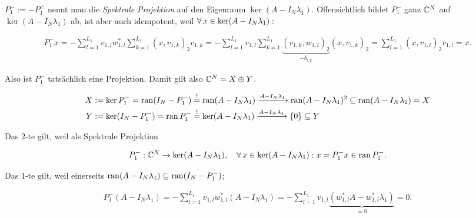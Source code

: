 \begin{remark} \label{spektrale_projektion}

    $P_1^- := -P_1^+$ nennt man die \textit{Spektrale Projektion} auf den Eigenraum $\ker (A - I_N \lambda_1)$.
    Offensichtlich bildet $P_1^-$ ganz $\mathbb{C}^N$ auf $\ker (A - I_N \lambda_1)$ ab, ist aber auch idempotent, weil $\forall \, x \in \ker (A - I_N \lambda_1):$

    \begin{align*}
        P_1^- x
        =
        -\sum_{l=1}^{L_1}
            v_{1, l}
            w_{1, l}^\ast
            \sum_{k=1}^{L_1}
                (x, v_{1, k})_2
                v_{1, k}
        =
        -\sum_{l=1}^{L_1}
            v_{1, l}
            \sum_{k=1}^{L_1}
                \underbrace{(v_{1, k}, w_{1, l})_2}_{-\delta_{l, k}}
                (x, v_{1, k})_2
        =
        \sum_{l=1}^{L_1}
            (x, v_{1, l})_2
            v_{1, l}
        =
        x.
    \end{align*}

    Also ist $P_1^-$ tatsächlich eine Projektion.
    Damit gilt also $ \mathbb{C}^N = X \oplus Y$.

    \begin{align*}
        X & := \ker P_1^- = \operatorname{ran} (I_N - P_1^-) \stackrel{!}{=} \operatorname{ran} (A - I_N \lambda_1) \xrightarrow{A - I_N \lambda_1} \operatorname{ran} (A - I_N \lambda_1)^2 \subseteq \operatorname{ran} (A - I_N \lambda_1) = X \\
        Y & := \ker (I_N - P_1^-) = \operatorname{ran} P_1^- \stackrel{!}{=} \ker (A - I_N \lambda_1) \xrightarrow{A - I_N \lambda_1} {\left \{ 0 \right \}} \subseteq Y
    \end{align*}

    Das $2$-te \Quote{!} gilt, weil als Spektrale Projektion

    \begin{align*}
        P_1^-: \mathbb{C}^N \to \ker (A - I_N \lambda_1),
        \quad
        \forall \, x \in \ker (A - I_N \lambda_1):
            x = P_1^- x \in \operatorname{ran} P_1^-.
    \end{align*}

    Das $1$-te \Quote{!} gilt, weil einerseits $\operatorname{ran} (A - I_N \lambda_1) \subseteq \operatorname{ran} (I_N - P_1^-)$;

    \begin{align*}
        P_1^- (A - I_N \lambda_1)
        =
        -\sum_{l=1}^{L_1}
            v_{1, l} w_{1, l}^\ast
        (A - I_N \lambda_1)
        =
        -\sum_{l=1}^{L_1}
            v_{1, l}
            \underbrace
            {
                (w_{1, l}^\ast A
                -
                w_{1, l}^\ast \lambda_1)
            }_{=0}
        =
        0.
    \end{align*}


\end{remark}
